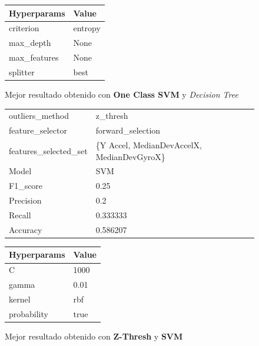 \begin{appendices}
\begin{figure}[htb]
			\begin{tabular}{ll}
				\toprule
				 Hyperparams &   Value \\
				\midrule
				   criterion & entropy \\
				   max\_depth &    None \\
				max\_features &    None \\
					splitter &    best \\
				\bottomrule
			\end{tabular}
			\caption{Mejor resultado obtenido con \textbf{One Class SVM} y \emph{Decision Tree}}
			\label{table:24}
		\end{figure}

		\begin{figure}[htb]
			\centering
			\begin{tabular}{ll}
				\toprule
					  outliers\_method &                                   z\_thresh \\
					 feature\_selector &                          forward\_selection \\
				features\_selected\_set & \{Y Accel, MedianDevAccelX, MedianDevGyroX\} \\
								Model &                                        SVM \\
						F1\_score &                                       0.25 \\
					   Precision &                                        0.2 \\
						  Recall &                                   0.333333 \\
						Accuracy &                                   0.586207 \\
				\bottomrule
			\end{tabular}
			\newline
			\newline

			\begin{tabular}{ll}
				\toprule
				Hyperparams & Value \\
				\midrule
						  C &  1000 \\
					  gamma &  0.01 \\
					 kernel &   rbf \\
				probability &  true \\
				\bottomrule
			\end{tabular}
			\caption{Mejor resultado obtenido con \textbf{Z-Thresh} y \textbf{SVM}}
			\label{table:25}
		\end{figure}


\end{appendices}
